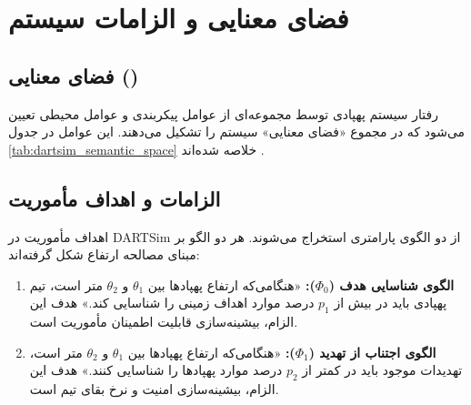 \documentclass[oneside,openany,a4paper,12pt]{article}
\begin{document}
\section{فضای معنایی و الزامات سیستم}

\subsection{فضای معنایی ()}
رفتار سیستم پهپادی توسط مجموعه‌ای از عوامل پیکربندی و عوامل محیطی تعیین می‌شود که در مجموع «فضای معنایی» سیستم را تشکیل می‌دهند. این عوامل در جدول \ref{tab:dartsim_semantic_space} خلاصه شده‌اند .

\begin{table}[H]
\centering
\caption{فضای معنایی سیستم پهپادی DARTSim}
\label{tab:dartsim_semantic_space}
\end{table}

\subsection{الزامات و اهداف مأموریت}
اهداف مأموریت در DARTSim از دو الگوی پارامتری استخراج می‌شوند. هر دو الگو بر مبنای مصالحه ارتفاع شکل گرفته‌اند:
\begin{enumerate}
    \item \textbf{الگوی شناسایی هدف ($\Phi_0$):} «هنگامی‌که ارتفاع پهپادها بین $\theta_1$ و $\theta_2$ متر است، تیم پهپادی باید در بیش از $p_1$ درصد موارد اهداف زمینی را شناسایی کند.» هدف این الزام، بیشینه‌سازی قابلیت اطمینان مأموریت است.
    \item \textbf{الگوی اجتناب از تهدید ($\Phi_1$):} «هنگامی‌که ارتفاع پهپادها بین $\theta_1$ و $\theta_2$ متر است، تهدیدات موجود باید در کمتر از $p_2$ درصد موارد پهپادها را شناسایی کنند.» هدف این الزام، بیشینه‌سازی امنیت و نرخ بقای تیم است.
\end{enumerate}
\end{document}
